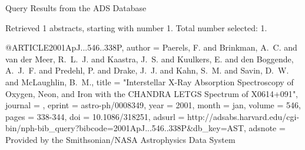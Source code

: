 Query Results from the ADS Database


Retrieved 1 abstracts, starting with number 1.  Total number selected: 1.

@ARTICLE{2001ApJ...546..338P,
   author = {{Paerels}, F. and {Brinkman}, A.~C. and {van der Meer}, R.~L.~J. and 
	{Kaastra}, J.~S. and {Kuulkers}, E. and {den Boggende}, A.~J.~F. and 
	{Predehl}, P. and {Drake}, J.~J. and {Kahn}, S.~M. and {Savin}, D.~W. and 
	{McLaughlin}, B.~M.},
    title = "{Interstellar X-Ray Absorption Spectroscopy of Oxygen, Neon, and Iron with the CHANDRA LETGS Spectrum of X0614+091}",
  journal = {\apj},
   eprint = {astro-ph/0008349},
     year = 2001,
    month = jan,
   volume = 546,
    pages = {338-344},
      doi = {10.1086/318251},
   adsurl = {http://adsabs.harvard.edu/cgi-bin/nph-bib_query?bibcode=2001ApJ...546..338P&db_key=AST},
  adsnote = {Provided by the Smithsonian/NASA Astrophysics Data System}
}


